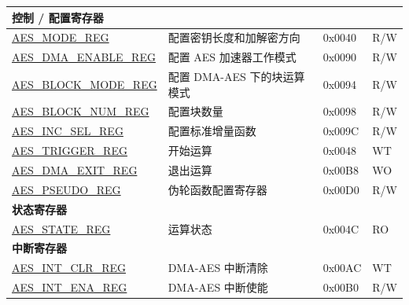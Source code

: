 \begin{longtable}{ | p{5.2cm} | p{6.6cm} | p{2cm} | p{1.2cm} | }
\multicolumn{4}{|l|}{\textbf{控制 / 配置寄存器}} \\ \hline

\hyperref[regdesc:AESMODEREG]{AES\_MODE\_REG}				            & 配置密钥长度和加解密方向			    & 0x0040 & R/W \\ \hline
\hyperref[regdesc:AESDMAENABLEREG]{AES\_DMA\_ENABLE\_REG}		        &	配置 AES 加速器工作模式					                & 0x0090 & R/W \\ \hline
\hyperref[regdesc:AESBLOCKMODEREG]{AES\_BLOCK\_MODE\_REG}		        &	配置 DMA-AES 下的块运算模式			        & 0x0094 & R/W \\ \hline
\hyperref[regdesc:AESBLOCKNUMREG]{AES\_BLOCK\_NUM\_REG}		   	        &	配置块数量			        & 0x0098 & R/W \\ \hline
\hyperref[regdesc:AESINCSELREG]{AES\_INC\_SEL\_REG}			            &	配置标准增量函数               & 0x009C & R/W \\ \hline
\hyperref[regdesc:AESTRIGGERREG]{AES\_TRIGGER\_REG}			&	开始运算		& 0x0048 & WT \\ \hline
\hyperref[regdesc:AESDMAEXITREG]{AES\_DMA\_EXIT\_REG}		&	退出运算	& 0x00B8 & WO \\ \hline
\hyperref[regdesc:AESPSEUDOREG]{AES\_PSEUDO\_REG} & 伪轮函数配置寄存器 & 0x00D0 & R/W \\ \hline

\multicolumn{4}{|l|}{\textbf{状态寄存器}} \\ \hline

\hyperref[regdesc:AESSTATEREG]{AES\_STATE\_REG}				&	运算状态			& 0x004C & RO \\ \hline

\multicolumn{4}{|l|}{\textbf{中断寄存器}} \\ \hline

\hyperref[regdesc:AESINTCLRREG]{AES\_INT\_CLR\_REG}			&	DMA-AES 中断清除	& 0x00AC & WT \\ \hline
\hyperref[regdesc:AESINTENAREG]{AES\_INT\_ENA\_REG}			&	DMA-AES 中断使能	& 0x00B0 & R/W \\ \hline

\end{longtable}

